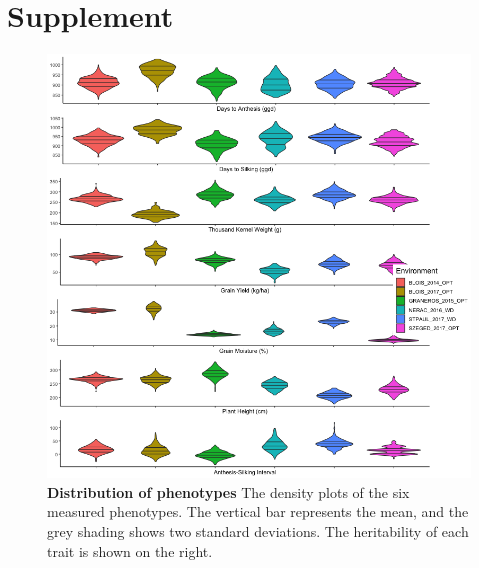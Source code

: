 \documentclass[article,9pt,twocolumn,twoside]{rilabRxiv}
\newcommand{\beginsupplement}{%
        \setcounter{table}{0}
        \renewcommand{\thetable}{S\arabic{table}}%
        \setcounter{figure}{0}
        \renewcommand{\thefigure}{S\arabic{figure}}%
     }
\begin{document}
\onecolumn
\beginsupplement
\section*{Supplement}
\begin{figure}[ht]
\centering
\includegraphics[width=\linewidth]{figures/Methods_Fig2_violinplot.png}
\caption{\textbf{Distribution of phenotypes} The density plots of the six measured phenotypes. The vertical bar represents the mean, and the grey shading shows two standard deviations. The heritability of each trait is shown on the right.}
\label{fig:supfigure1}
\end{figure}
\end{document}
